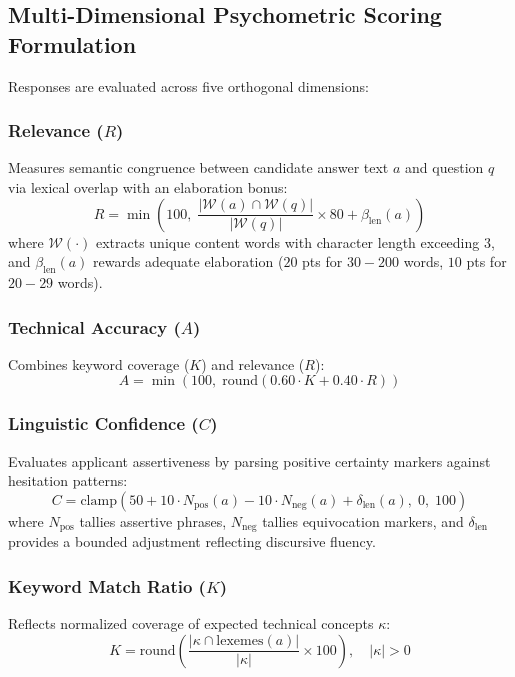 \documentclass[conference]{IEEEtran}
\begin{document}
\subsection{Multi-Dimensional Psychometric Scoring Formulation}

Responses are evaluated across five orthogonal dimensions:

\subsubsection{Relevance ($R$)}
Measures semantic congruence between candidate answer text $a$ and question $q$ via lexical overlap with an elaboration bonus:
\begin{equation}
R = \min\left(100, \; \frac{|\mathcal{W}(a) \cap \mathcal{W}(q)|}{|\mathcal{W}(q)|} \times 80 + \beta_{\text{len}}(a)\right)
\end{equation}
where $\mathcal{W}(\cdot)$ extracts unique content words with character length exceeding 3, and $\beta_{\text{len}}(a)$ rewards adequate elaboration ($20$ pts for $30-200$ words, $10$ pts for $20-29$ words).

\subsubsection{Technical Accuracy ($A$)}
Combines keyword coverage ($K$) and relevance ($R$):
\begin{equation}
A = \min(100, \; \text{round}(0.60 \cdot K + 0.40 \cdot R))
\end{equation}

\subsubsection{Linguistic Confidence ($C$)}
Evaluates applicant assertiveness by parsing positive certainty markers against hesitation patterns:
\begin{equation}
C = \text{clamp}\left(50 + 10 \cdot N_{\text{pos}}(a) - 10 \cdot N_{\text{neg}}(a) + \delta_{\text{len}}(a), \; 0, \; 100\right)
\end{equation}
where $N_{\text{pos}}$ tallies assertive phrases, $N_{\text{neg}}$ tallies equivocation markers, and $\delta_{\text{len}}$ provides a bounded adjustment reflecting discursive fluency.

\subsubsection{Keyword Match Ratio ($K$)}
Reflects normalized coverage of expected technical concepts $\kappa$:
\begin{equation}
K = \text{round}\left(\frac{|\kappa \cap \text{lexemes}(a)|}{|\kappa|} \times 100\right), \quad |\kappa| > 0
\end{equation}
\end{document}
